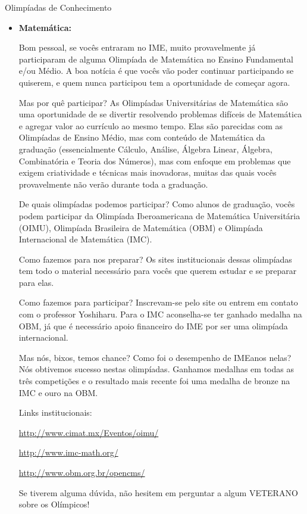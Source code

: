 \begin{subsecao}{Olimpíadas de Conhecimento}

\begin{itemize}

\item{\bf Matemática: }

Bom pessoal, se vocês entraram no IME, muito provavelmente já participaram
de alguma Olimpíada de Matemática no Ensino Fundamental e/ou Médio. A 
boa notícia é que vocês vão poder continuar participando se quiserem,
e quem nunca participou tem a oportunidade de começar agora.

Mas por quê participar? As Olimpíadas Universitárias de Matemática são uma
oportunidade de se divertir resolvendo problemas difíceis de Matemática e agregar
valor ao currículo ao mesmo tempo. Elas são parecidas com as Olimpíadas de
Ensino Médio, mas com conteúdo de Matemática da graduação (essencialmente 
Cálculo, Análise, Álgebra Linear, Álgebra, Combinatória e Teoria dos Números), 
mas com enfoque em problemas que exigem criatividade e técnicas mais inovadoras,
muitas das quais vocês provavelmente não verão durante toda a graduação.

De quais olimpíadas podemos participar? Como alunos de graduação, vocês podem
participar da Olimpíada Iberoamericana de Matemática Universitária (OIMU),
Olimpíada Brasileira de Matemática (OBM) e Olimpíada Internacional de 
Matemática (IMC).

Como fazemos para nos preparar? Os sites institucionais dessas olimpíadas
tem todo o material necessário para vocês que querem estudar e se preparar
para elas.

Como fazemos para participar? Inscrevam-se pelo site ou entrem em contato com
o professor Yoshiharu. Para o IMC aconselha-se ter ganhado medalha na OBM,
já que é necessário apoio financeiro do IME por ser uma olimpíada internacional.

Mas nós, bixos, temos chance? Como foi o desempenho de IMEanos nelas? Nós obtivemos
sucesso nestas olimpíadas. Ganhamos medalhas em todas as três competições e
o resultado mais recente foi uma medalha de bronze na IMC e ouro na OBM.

Links institucionais:

\url{http://www.cimat.mx/Eventos/oimu/}

\url{http://www.imc-math.org/}

\url{http://www.obm.org.br/opencms/}

Se tiverem alguma dúvida, não hesitem em perguntar a algum VETERANO sobre os
Olímpicos!


\end{itemize}
\end{subsecao}

